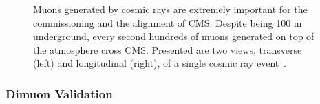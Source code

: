 \begin{figure}[!hbt]
\begin{subfigure}[t]{0.53\textwidth}
    \caption{}
    \label{fig:cosmicfront}
\end{subfigure}
\caption{Muons generated by cosmic rays are extremely important for the commissioning and the alignment of CMS. Despite being 100 m underground, every second hundreds of muons generated on top of the atmosphere cross CMS. Presented are two views, transverse (left) and longitudinal (right), of a single cosmic ray event~\cite{Collaboration:2806755}.}
\label{fig:cosmicevent}
\end{figure}




\subsubsection{Dimuon Validation}

